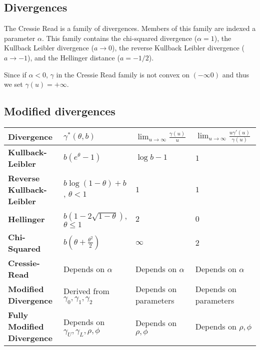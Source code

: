 \documentclass[
  letterpaper,
  DIV=11,
  numbers=noendperiod]{scrartcl}
\begin{document}
\subsection{Divergences}\label{divergences}

The Cressie Read is a family of divergences. Members of this family are
indexed a parameter \(\alpha\). This family contains the chi-squared
divergence (\(\alpha = 1\)), the Kullback Leibler divergence
(\(a \to 0\)), the reverse Kullback Leibler divergence (\(a \to -1\)),
and the Hellinger distance (\(a = -1/2\)).

Since if \(\alpha<0\), \(\gamma\) in the Cressie Read family is not
convex on \((-\infty 0)\) and thus we set \(\gamma(u)=+\infty\).

\subsection{Modified divergences}\label{modified-divergences}

\begin{longtable}[]{@{}
  >{\raggedright\arraybackslash}p{}
  >{\raggedright\arraybackslash}p{}
  >{\raggedright\arraybackslash}p{}
  >{\raggedright\arraybackslash}p{}@{}}
\toprule\noalign{}
\begin{minipage}[b]{\linewidth}\raggedright
\textbf{Divergence}
\end{minipage} & \begin{minipage}[b]{\linewidth}\raggedright
\textbf{\(\gamma^*(\theta, b)\)}
\end{minipage} & \begin{minipage}[b]{\linewidth}\raggedright
\textbf{\(\lim_{u \to \infty} \frac{\gamma(u)}{u}\)}
\end{minipage} & \begin{minipage}[b]{\linewidth}\raggedright
\textbf{\(\lim_{u \to \infty} \frac{u \gamma'(u)}{\gamma(u)}\)}
\end{minipage} \\
\midrule\noalign{}
\endhead
\bottomrule\noalign{}
\endlastfoot
\textbf{Kullback-Leibler} & \(b (e^\theta - 1)\) & \(\log b - 1\) &
\(1\) \\
\textbf{Reverse Kullback-Leibler} & \(b \log(1 - \theta) + b\),
\(\theta < 1\) & \(1\) & \(1\) \\
\textbf{Hellinger} & \(b (1 - 2\sqrt{1 - \theta})\), \(\theta \leq 1\) &
\(2\) & \(0\) \\
\textbf{Chi-Squared} & \(b\left(\theta + \frac{\theta^2}{2}\right)\) &
\(\infty\) & \(2\) \\
\textbf{Cressie-Read} & Depends on \(\alpha\) & Depends on \(\alpha\) &
Depends on \(\alpha\) \\
\textbf{Modified Divergence} & Derived from
\(\gamma_0, \gamma_1, \gamma_2\) & Depends on parameters & Depends on
parameters \\
\textbf{Fully Modified Divergence} & Depends on
\(\gamma_U, \gamma_L, \rho, \phi\) & Depends on \(\rho, \phi\) & Depends
on \(\rho, \phi\) \\
\end{longtable}
\end{document}

